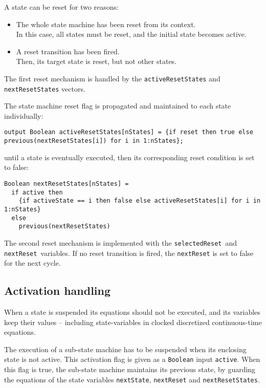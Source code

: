 A state can be reset for two reasons:
\begin{itemize}
\item
  The whole state machine has been reset from its context.\\
  In this case, all states must be reset, and the initial state becomes
  active.
\item
  A reset transition has been fired.\\
  Then, its target state is reset, but not other states.
\end{itemize}

The first reset mechanism is handled by the \lstinline!activeResetStates! and \lstinline!nextResetStates! vectors.

The state machine reset flag is propagated and maintained to each state individually:
\begin{lstlisting}[language=modelica]
output Boolean activeResetStates[nStates] = {if reset then true else previous(nextResetStates[i]) for i in 1:nStates};
\end{lstlisting}
until a state is eventually executed, then its corresponding reset condition is set to false:
\begin{lstlisting}[language=modelica]
Boolean nextResetStates[nStates] =
  if active then
    {if activeState == i then false else activeResetStates[i] for i in 1:nStates}
  else
    previous(nextResetStates)
\end{lstlisting}
The second reset mechanism is implemented with the \lstinline!selectedReset!~and \lstinline!nextReset!~variables.  If no reset transition is fired, the \lstinline!nextReset! is set to false for the next cycle.

\subsection{Activation handling}\label{activation-handling}

When a state is suspended its equations should not be executed, and its variables keep their values -- including state-variables in clocked discretized continuous-time equations.

The execution of a sub-state machine has to be suspended when its
enclosing state is not active. This activation flag is given as a
\lstinline!Boolean! input \lstinline!active!. When this flag is true, the sub-state machine
maintains its previous state, by guarding the equations of the state
variables \lstinline!nextState!, \lstinline!nextReset! and \lstinline!nextResetStates!.

